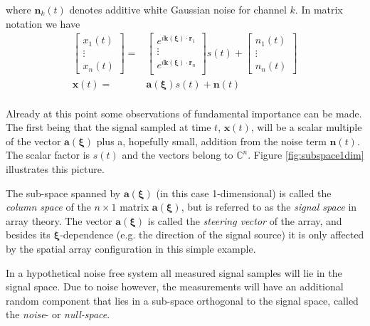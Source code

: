 \documentclass[11pt]{article}
\renewcommand{\vct}[1]{\boldsymbol{#1}}
\begin{document}
where $\vct{n}_k(t)$ denotes additive white Gaussian noise for channel $k$.
In matrix notation we have
\begin{equation} \label{eq:1}
\begin{split}
    \begin{bmatrix}
        x_1(t)\\
        \vdots\\
        x_n(t)
    \end{bmatrix}
    =&
    \begin{bmatrix}
        e^{i{\vct{k}(\vct{\xi})}\cdot{\vct{r}_1}}\\
        \vdots\\
        e^{i{\vct{k}(\vct{\xi})}\cdot{\vct{r}_n}} \\
    \end{bmatrix}
    s(t) +
    \begin{bmatrix}
        n_1(t)\\
        \vdots\\
        n_n(t)
    \end{bmatrix}
    \\
    \vct{x}(t) =& \vct{a}(\vct{\xi})s(t) + \vct{n}(t)\\
\end{split}
\end{equation}

Already at this point some observations of fundamental importance can be made. The first being that the signal sampled at time $t$, $\vct{x}(t)$, will be a scalar multiple of the vector $\vct{a}(\vct{\xi})$ plus a, hopefully small, addition from the noise term $\vct{n}(t)$. The scalar factor is $s(t)$ and the vectors belong to $\mathbb C^n$. Figure \ref{fig:subspace1dim} illustrates this picture.

The sub-space spanned by $\vct{a}(\vct{\xi})$ (in this case 1-dimensional) is called the \textit{column space} of the $n\times1$ matrix $\vct{a}(\vct{\xi})$, but is referred to as the \textit{signal space} in array theory. The vector $\vct{a}(\vct{\xi})$ is called the \textit{steering vector} of the array, and besides its $\vct{\xi}$-dependence (e.g. the direction of the signal source) it is only affected by the spatial array configuration in this simple example.

In a hypothetical noise free system all measured signal samples will lie in the signal space. Due to noise however, the measurements will have an additional random component that lies in a sub-space orthogonal to the signal space, called the \textit{noise}- or \textit{null-space}.
\end{document}
